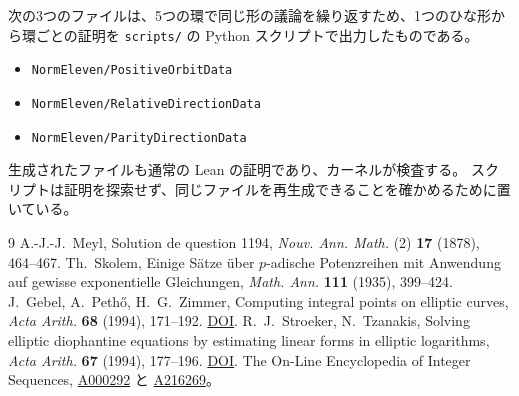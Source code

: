 \documentclass[a4paper,11pt]{ltjsarticle}
\theoremstyle{jplain}
\numberwithin{equation}{section}
\numberwithin{table}{section}
\begin{document}
次の3つのファイルは、5つの環で同じ形の議論を繰り返すため、1つのひな形から環ごとの証明を \texttt{scripts/} の Python スクリプトで出力したものである。
\begin{itemize}
\item \texttt{NormEleven/PositiveOrbitData}
\item \texttt{NormEleven/RelativeDirectionData}
\item \texttt{NormEleven/ParityDirectionData}
\end{itemize}
生成されたファイルも通常の Lean の証明であり、カーネルが検査する。
スクリプトは証明を探索せず、同じファイルを再生成できることを確かめるために置いている。

\begin{thebibliography}{9}
 A.-J.-J.~Meyl, Solution de question 1194, \emph{Nouv. Ann. Math.} (2) \textbf{17} (1878), 464--467.
 Th.~Skolem, Einige S\"atze \"uber $p$-adische Potenzreihen mit Anwendung auf gewisse exponentielle Gleichungen, \emph{Math. Ann.} \textbf{111} (1935), 399--424.
 J.~Gebel, A.~Peth\H{o}, H.~G.~Zimmer, Computing integral points on elliptic curves, \emph{Acta Arith.} \textbf{68} (1994), 171--192. \href{https://doi.org/10.4064/aa-68-2-171-192}{DOI}.
 R.~J.~Stroeker, N.~Tzanakis, Solving elliptic diophantine equations by estimating linear forms in elliptic logarithms, \emph{Acta Arith.} \textbf{67} (1994), 177--196. \href{https://doi.org/10.4064/aa-67-2-177-196}{DOI}.
 The On-Line Encyclopedia of Integer Sequences, \href{https://oeis.org/A000292}{A000292} と \href{https://oeis.org/A216269}{A216269}。
\end{thebibliography}
\end{document}
